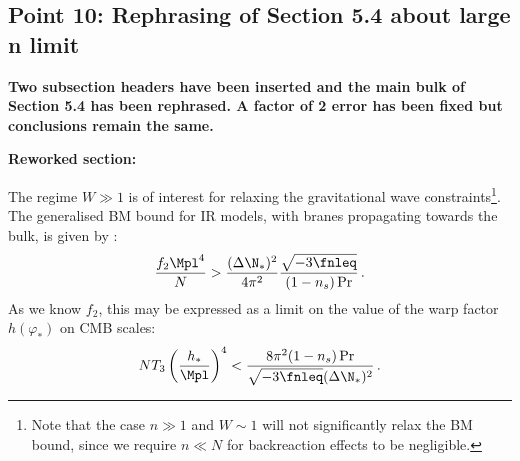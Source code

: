 \subsection{Point 10: Rephrasing of Section 5.4 about large n limit}
\textbf{Two subsection headers have been inserted and the main bulk of Section 5.4 has been
rephrased. A factor of 2 error has been fixed but conclusions remain the same.}

\textbf{Reworked section:}

The regime $W \gg 1$ is of interest for 
relaxing the gravitational wave constraints\footnote{Note that 
the case $n \gg 1$ and
$W \sim 1$ will not significantly relax the BM bound, 
since we require $n \ll N$ for backreaction effects to be negligible.}. 
The generalised BM bound for IR models, with branes propagating towards the bulk, is given by 
:
% 
\begin{equation}
\label{eq:f2IRlower-multi}
\frac{f_2\Mpl^4}{N} > \frac{(\Delta \N_*)^2}{4\pi^2}
\frac{\sqrt{-3\fnleq}}{(1-n_s)\Pr}  \,.
\end{equation}
% 
As we know $f_2$, this may be expressed as 
a limit on the value of the warp factor $h(\varphi_*)$ on CMB scales: 
% 
\begin{equation}
\label{eq:warptorelax}
N T_3 \left(\frac{h_*}{\Mpl}\right)^4 < 
\frac{8\pi^2 (1-n_s)\Pr}{\sqrt{-3\fnleq}(\Delta \N_*)^2} \,.
\end{equation}
% 


